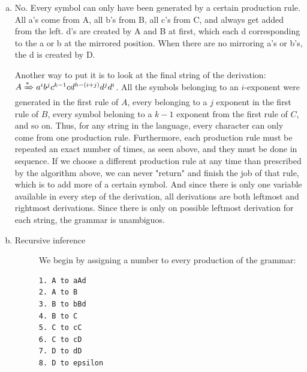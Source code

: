 \documentclass{article}
\begin{document}
\begin{enumerate}[(a)]
    \item No. Every symbol can only have been generated by a certain production rule. All a's come from A, all b's from B, all c's from C, and always get added from the left. d's are created by A and B at first, which each d corresponding to the a or b at the mirrored position. When there are no mirroring a's or b's, the d is created by D.

        Another way to put it is to look at the final string of the derivation: $A \xRightarrow{*} a^ib^jc^{k-1}cd^{h-(i+j)}d^jd^i $. All the symbols belonging to an $i$-exponent were generated in the first rule of $A$, every belonging to a $j$ exponent in the first rule of $B$, every symbol beloning to a $k-1$ exponent from the first rule of $C$, and so on. Thus, for any string in the language, every character can only come from one production rule. Furthermore, each production rule must be repeated an exact number of times, as seen above, and they must be done in sequence. If we choose a different production rule at any time than prescribed by the algorithm above, we can never "return" and finish the job of that rule, which is to add more of a certain symbol. And since there is only one variable available in every step of the derivation, all derivations are both leftmost and rightmost derivations. Since there is only on possible leftmost derivation for each string, the grammar is unambiguos.

    \item

        \begin{description}
            \item[Recursive inference]

        We begin by assigning a number to every production of the grammar:

\begin{lstlisting}
1. A to aAd
2. A to B 
3. B to bBd
4. B to C 
5. C to cC 
6. C to cD 
7. D to dD
8. D to epsilon
\end{lstlisting}


\end{description}
\end{enumerate}
\end{document}
